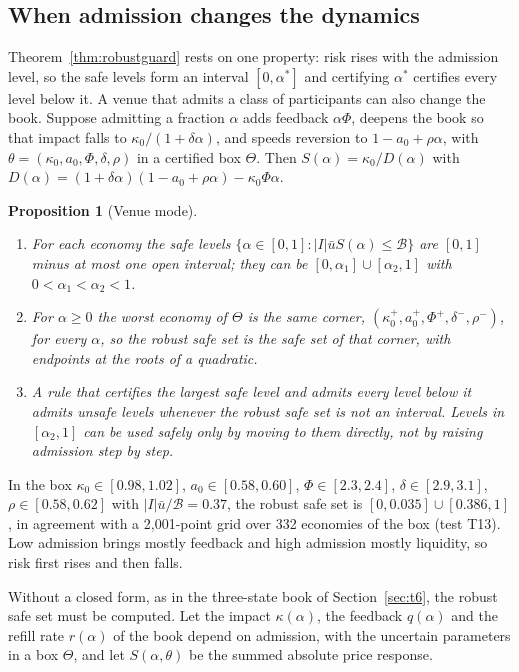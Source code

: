 \documentclass[12pt]{article}
\newtheorem{proposition}[theorem]{Proposition}
\theoremstyle{definition}
\theoremstyle{remark}
\begin{document}
\subsection{When admission changes the dynamics}\label{sec:venue}
Theorem~\ref{thm:robustguard} rests on one property: risk rises with the admission level, so the safe levels form an interval $[0,\alpha^*]$ and certifying $\alpha^*$ certifies every level below it. A venue that admits a class of participants can also change the book. Suppose admitting a fraction $\alpha$ adds feedback $\alpha\Phi$, deepens the book so that impact falls to $\kappa_0/(1+\delta\alpha)$, and speeds reversion to $1-a_0+\rho\alpha$, with $\theta=(\kappa_0,a_0,\Phi,\delta,\rho)$ in a certified box $\Theta$. Then $S(\alpha)=\kappa_0/D(\alpha)$ with $D(\alpha)=(1+\delta\alpha)(1-a_0+\rho\alpha)-\kappa_0\Phi\alpha$.

\begin{proposition}[Venue mode]\label{prop:venue}
\begin{enumerate}[label=(\roman*)]
\item For each economy the safe levels $\{\alpha\in[0,1]:|I|\bar uS(\alpha)\le\mathcal B\}$ are $[0,1]$ minus at most one open interval; they can be $[0,\alpha_1]\cup[\alpha_2,1]$ with $0<\alpha_1<\alpha_2<1$.
\item For $\alpha\ge0$ the worst economy of $\Theta$ is the same corner, $(\kappa_0^+,a_0^+,\Phi^+,\delta^-,\rho^-)$, for every $\alpha$, so the robust safe set is the safe set of that corner, with endpoints at the roots of a quadratic.
\item A rule that certifies the largest safe level and admits every level below it admits unsafe levels whenever the robust safe set is not an interval. Levels in $[\alpha_2,1]$ can be used safely only by moving to them directly, not by raising admission step by step.
\end{enumerate}
\end{proposition}

In the box $\kappa_0\in[0.98,1.02]$, $a_0\in[0.58,0.60]$, $\Phi\in[2.3,2.4]$, $\delta\in[2.9,3.1]$, $\rho\in[0.58,0.62]$ with $|I|\bar u/\mathcal B=0.37$, the robust safe set is $[0,0.035]\cup[0.386,1]$, in agreement with a 2{,}001-point grid over 332 economies of the box (test T13). Low admission brings mostly feedback and high admission mostly liquidity, so risk first rises and then falls.

Without a closed form, as in the three-state book of Section~\ref{sec:t6}, the robust safe set must be computed. Let the impact $\kappa(\alpha)$, the feedback $q(\alpha)$ and the refill rate $r(\alpha)$ of the book depend on admission, with the uncertain parameters in a box $\Theta$, and let $S(\alpha,\theta)$ be the summed absolute price response.
\end{document}

